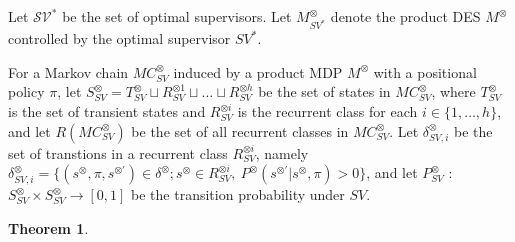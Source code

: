 \documentclass[10pt, twocolumn]{article}
\newtheorem{theorem}{Theorem}
\begin{document}
Let $\mathcal{SV}^{\ast}$ be the set of optimal supervisors. Let $M^{\otimes}_{SV^{\ast}}$ denote the product DES $M^{\otimes}$ controlled by the optimal supervisor $SV^{\ast}$.

For a Markov chain $MC^{\otimes}_{SV}$ induced by a product MDP $M^{\otimes}$ with a positional policy $\pi$, let $S^{\otimes}_{SV}= T^{\otimes}_{SV} \sqcup R^{\otimes 1}_{SV} \sqcup \ldots \sqcup R^{\otimes h}_{SV}$ be the set of states in $MC^{\otimes}_{SV}$, where $T^{\otimes}_{SV}$ is the set of transient states and $R^{\otimes i}_{SV}$ is the recurrent class for each $i \in \{ 1, \ldots ,h \}$, and let $R(MC^{\otimes}_{SV})$ be the set of all recurrent classes in $MC^{\otimes}_{SV}$. Let $\delta^{\otimes}_{SV,i}$ be the set of transtions in a recurrent class $R^{\otimes i}_{SV}$, namely $\delta^{\otimes}_{SV,i} = \{ (s^{\otimes}, \pi, s^{\otimes \prime}) \in \delta^{\otimes} ; s^{\otimes} \in R^{\otimes i}_{SV},\ P^{\otimes}(s^{\otimes \prime}|s^{\otimes}, \pi) > 0 \}$, and let $P^{\otimes}_{SV}$ : $S^{\otimes}_{SV} \times S^{\otimes}_{SV} \rightarrow [0,1]$ be the transition probability under $SV$.

\begin{theorem}

\end{theorem}
\end{document}
